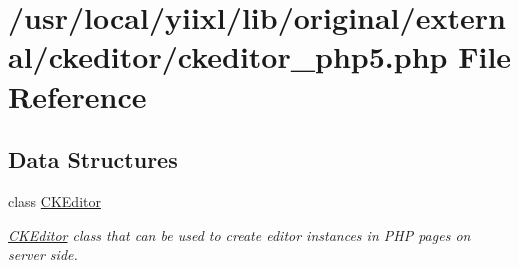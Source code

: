 \hypertarget{ckeditor__php5_8php}{
\section{/usr/local/yiixl/lib/original/external/ckeditor/ckeditor\_\-php5.php File Reference}
\label{ckeditor__php5_8php}
}
\subsection*{Data Structures}
\begin{DoxyCompactItemize}
\item 
class \hyperlink{classCKEditor}{CKEditor}
\begin{DoxyCompactList}\small\item\em \hyperlink{classCKEditor}{CKEditor} class that can be used to create editor instances in PHP pages on server side. \item\end{DoxyCompactList}\end{DoxyCompactItemize}
